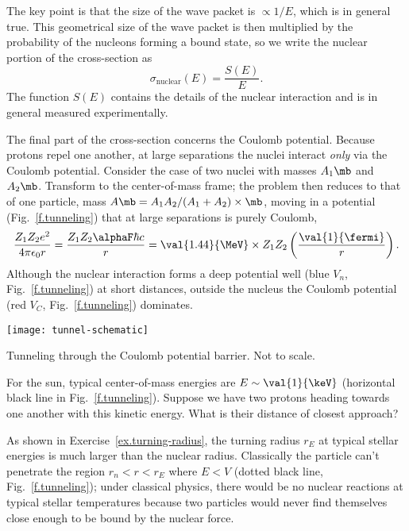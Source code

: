 The key point is that the size of the wave packet is $\propto 1/E$, which is in general true. This geometrical size of the wave packet is then multiplied by the probability of the nucleons forming a bound state, so we write the nuclear portion of the cross-section as
\begin{equation}\label{e.nuclear-cross-section}
	\sigma_{\mathrm{nuclear}}(E) = \frac{S(E)}{E}.
\end{equation}
The function $S(E)$ contains the details of the nuclear interaction and is in general measured experimentally.

The final part of the cross-section concerns the Coulomb potential.
Because protons repel one another, at large separations the nuclei interact \emph{only} via the Coulomb potential. Consider the case of two nuclei with masses $A_{1}\mb$ and $A_{2}\mb$. Transform to the center-of-mass frame; the problem then reduces to that of one particle, mass $A\mb = A_{1}A_{2}/(A_{1}+A_{2})\times\mb$, moving in a potential (Fig.~\ref{f.tunneling}) that at large separations is purely Coulomb,
\[ \frac{Z_{1}Z_{2}e^{2}}{4\pi\epsilon_{0}r} = \frac{Z_{1}Z_{2}\alphaF\hbar c}{r} = \val{1.44}{\MeV}\times Z_{1}Z_{2}\left(\frac{\val{1}{\fermi}}{r}\right). \]
Although the nuclear interaction forms a deep potential well (blue $V_{n}$, Fig.~\ref{f.tunneling}) at short distances, outside the nucleus the Coulomb potential (red $V_{C}$, Fig.~\ref{f.tunneling})  dominates.
\begin{marginfigure}
\texttt{[image: tunnel-schematic]}
\caption[Tunneling through the Coulomb potential barrier]{Tunneling through the Coulomb potential barrier. Not to scale.}
\label{f.tunneling}
\end{marginfigure}

\begin{exercisebox}
\label{ex.turning-radius}
For the sun, typical center-of-mass energies are $E \sim \val{1}{\keV}$ (horizontal black line in Fig.~\ref{f.tunneling}). Suppose we have two protons heading towards one another with this kinetic  energy. What is their distance of closest approach?
\end{exercisebox}

As shown in Exercise~\ref{ex.turning-radius}, the turning radius $r_{E}$ at typical stellar energies is much larger than the nuclear radius.  Classically the particle can't penetrate the region $r_{n} < r < r_{E}$ where $E < V$ (dotted black line, Fig.~\ref{f.tunneling}); under classical physics, there would be no nuclear reactions at typical stellar temperatures because two particles would never find themselves close enough to be bound by the nuclear force.

